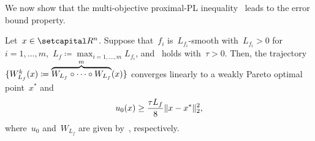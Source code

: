 \documentclass[../main]{subfiles}
\begin{document}
We now show that the multi-objective proximal-PL inequality~ leads to the error bound property.
\begin{theorem} 
    Let~$x \in \setR^n$.
    Suppose that~$f_i$ is~$L_{f_i}$-smooth with~$L_{f_i} > 0$ for~$i = 1, \dots, m$,~$L_f \coloneqq \max_{i = 1, \dots, m} L_{f_i}$, and~ holds with~$\tau > 0$.
    Then, the trajectory~$\lbrace W_{L_f}^k(x) \coloneqq \overbrace{W_{L_f} \circ \dots \circ W_{L_f}}^{m}(x)\rbrace$ converges linearly to a weakly Pareto optimal point~$x^*$ and
    \begin{equation}
        u_0(x) \ge \frac{\tau L_f}{8} \lVert x - x^*\rVert_2^2
    ,\end{equation}
    where~$u_0$ and~$W_{L_f}$ are given by~, respectively.
\end{theorem}
\end{document}
